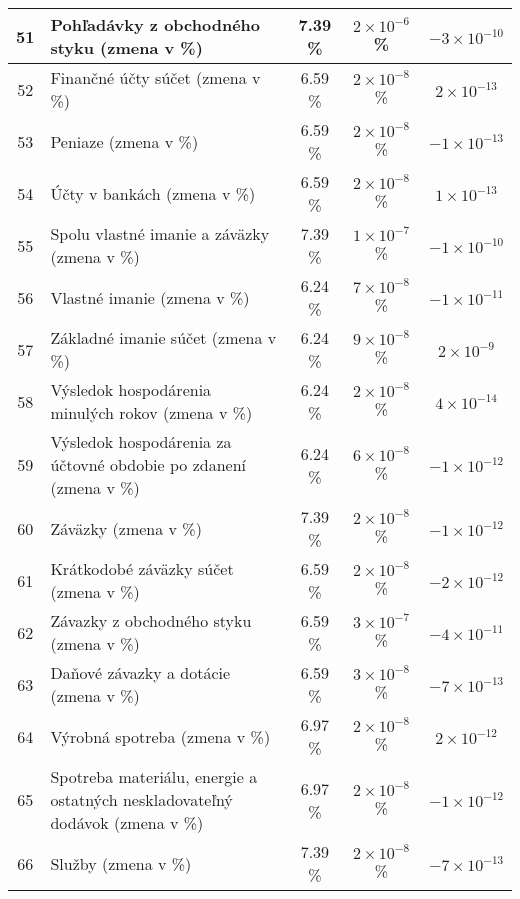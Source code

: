 \begin{longtable}{ |c|p{5cm}|c|c|c| }
        \hline
        51 & Pohľadávky z obchodného styku (zmena v \%) & 7.39 \% & \(2 \times 10^{-6}\) \% & \(-3 \times 10^{-10}\) \\
        \hline
        52 & Finančné účty súčet (zmena v \%) & 6.59 \% & \(2 \times 10^{-8}\) \% & \(2 \times 10^{-13}\) \\
        \hline
        53 & Peniaze (zmena v \%) & 6.59 \% & \(2 \times 10^{-8}\) \% & \(-1 \times 10^{-13}\) \\
        \hline
        54 & Účty v bankách (zmena v \%) & 6.59 \% & \(2 \times 10^{-8}\) \% & \(1 \times 10^{-13}\) \\
        \hline
        55 & Spolu vlastné imanie a záväzky (zmena v \%) & 7.39 \% & \(1 \times 10^{-7}\) \% & \(-1 \times 10^{-10}\) \\
        \hline
        56 & Vlastné imanie (zmena v \%) & 6.24 \% & \(7 \times 10^{-8}\) \% & \(-1 \times 10^{-11}\) \\
        \hline
        57 & Základné imanie súčet (zmena v \%) & 6.24 \% & \(9 \times 10^{-8}\) \% & \(2 \times 10^{-9}\) \\
        \hline
        58 & Výsledok hospodárenia minulých rokov (zmena v \%) & 6.24 \% & \(2 \times 10^{-8}\) \% & \(4 \times 10^{-14}\) \\
        \hline
        59 & Výsledok hospodárenia za účtovné obdobie po zdanení (zmena v \%) & 6.24 \% & \(6 \times 10^{-8}\) \% & \(-1 \times 10^{-12}\) \\
        \hline
        60 & Záväzky (zmena v \%) & 7.39 \% & \(2 \times 10^{-8}\) \% & \(-1 \times 10^{-12}\) \\
        \hline
        61 & Krátkodobé záväzky súčet (zmena v \%) & 6.59 \% & \(2 \times 10^{-8}\) \% & \(-2 \times 10^{-12}\) \\
        \hline
        62 & Závazky z obchodného styku (zmena v \%) & 6.59 \% & \(3 \times 10^{-7}\) \% & \(-4 \times 10^{-11}\) \\
        \hline
        63 & Daňové závazky a dotácie (zmena v \%) & 6.59 \% & \(3 \times 10^{-8}\) \% & \(-7 \times 10^{-13}\) \\
        \hline
        64 & Výrobná spotreba (zmena v \%) & 6.97 \% & \(2 \times 10^{-8}\) \% & \(2 \times 10^{-12}\) \\
        \hline
        65 & Spotreba materiálu, energie a ostatných neskladovateľný dodávok (zmena v \%) & 6.97 \% & \(2 \times 10^{-8}\) \% & \(-1 \times 10^{-12}\) \\
        \hline
        66 & Služby (zmena v \%) & 7.39 \% & \(2 \times 10^{-8}\) \% & \(-7 \times 10^{-13}\) \\

\end{longtable}
